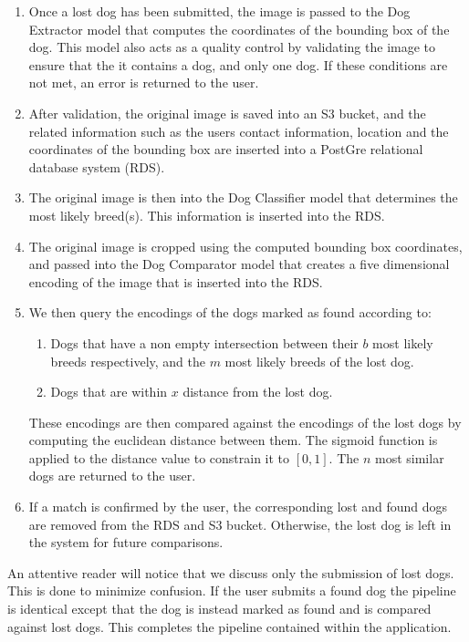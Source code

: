 \documentclass{article}
\begin{document}
\begin{enumerate}
  
  \item Once a lost dog has been submitted, the image is passed to the Dog Extractor model that computes the coordinates of the bounding box of the dog.  This model also acts as a quality control by validating the image to ensure that the it contains a dog, and only one dog.  If these conditions are not met, an error is returned to the user.
  
  \item After validation, the original image is saved into an S3 bucket, and the related information such as the users contact information, location and the coordinates of the bounding box are inserted into a PostGre relational database system (RDS).
  
  \item The original image is then into the Dog Classifier model that determines the most likely breed(s).  This information is inserted into the RDS.
  
  \item The original image is cropped using the computed bounding box coordinates, and passed into the Dog Comparator model that creates a five dimensional encoding of the image that is inserted into the RDS.
  
  \item We then query the encodings of the dogs marked as found according to:
  
  \begin{enumerate}
      \item Dogs that have a non empty intersection between their $b$ most likely breeds respectively, and the $m$ most likely breeds of the lost dog.
      \item Dogs that are within $x$ distance from the lost dog.
  \end{enumerate}

   These encodings are then compared against the encodings of the lost dogs by computing the euclidean distance between them.  The sigmoid function is applied to the distance value to constrain it to $[0,1]$.  The $n$ most similar dogs are returned to the user.
  
  \item If a match is confirmed by the user, the corresponding lost and found dogs are removed from the RDS and S3 bucket.  Otherwise, the lost dog is left in the system for future comparisons.
 
\end{enumerate}
An attentive reader will notice that we discuss only the submission of lost dogs.  This is done to minimize confusion.  If the user submits a found dog the pipeline is identical except that the dog is instead marked as found and is compared against lost dogs.  This completes the pipeline contained within the application. 
\end{document}
